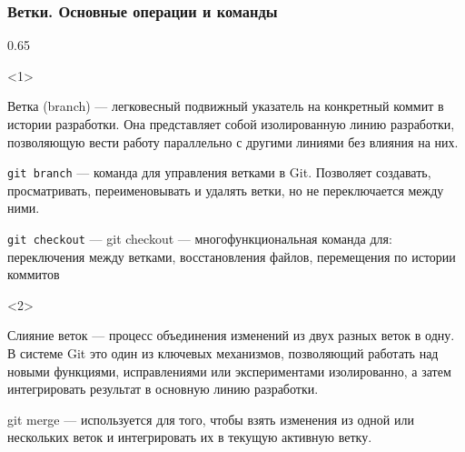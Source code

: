 \documentclass[9pt, aspectratio=1610]{beamer}
\begin{document}
\begin{frame}[fragile]\frametitle{Ветки. Основные операции и команды}
	
	
	\begin{overlayarea}{\textwidth}{0.65\textheight} %
		
	\begin{onlyenv}
		
		\begin{alertblock}{Ветка (branch) ---}
		легковесный подвижный указатель на конкретный коммит в истории разработки. Она представляет собой изолированную линию разработки, позволяющую вести работу параллельно с другими линиями без влияния на них.
		\end{alertblock}	
		
		\begin{alertblock}{\Verb|git branch| ---}
			команда для управления ветками в Git. Позволяет создавать, просматривать, переименовывать и удалять ветки, но не переключается между ними.
		\end{alertblock}
		
		\begin{alertblock}{\Verb|git checkout| ---}
			git checkout — многофункциональная команда для: переключения между ветками, восстановления файлов, перемещения по истории коммитов					
		\end{alertblock}	
		
	\end{onlyenv}
	
	\begin{onlyenv}
		
		\begin{alertblock}{Слияние веток --- }
			процесс объединения изменений из двух разных веток в одну. В системе Git это один из ключевых механизмов, позволяющий работать над новыми функциями, исправлениями или экспериментами изолированно, а затем интегрировать результат в основную линию разработки.
		\end{alertblock}
		
		\begin{alertblock}{git merge --- }
			используется для того, чтобы взять изменения из одной или нескольких веток и интегрировать их в текущую активную ветку.
		\end{alertblock}
		
	\end{onlyenv}
	
	\end{overlayarea}
	
	\centering
	

\end{frame}
\end{document}
